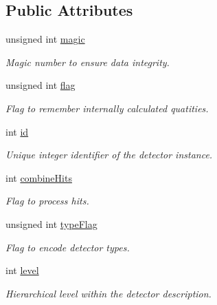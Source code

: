 \subsection*{Public Attributes}
\begin{DoxyCompactItemize}
\item 
unsigned int \hyperlink{class_d_d4hep_1_1_geometry_1_1_det_element_object_a9a65b2f4323f3df2d7bdb7858b216fb6}{magic}
\begin{DoxyCompactList}\small\item\em Magic number to ensure data integrity. \item\end{DoxyCompactList}\item 
unsigned int \hyperlink{class_d_d4hep_1_1_geometry_1_1_det_element_object_abcab90748d7423310fbf73fcc54cef47}{flag}
\begin{DoxyCompactList}\small\item\em Flag to remember internally calculated quatities. \item\end{DoxyCompactList}\item 
int \hyperlink{class_d_d4hep_1_1_geometry_1_1_det_element_object_a32d2a3f77fa7afde62ad5d08aa14919f}{id}
\begin{DoxyCompactList}\small\item\em Unique integer identifier of the detector instance. \item\end{DoxyCompactList}\item 
int \hyperlink{class_d_d4hep_1_1_geometry_1_1_det_element_object_a36e650a06cc4b82337bc3354bd38402a}{combineHits}
\begin{DoxyCompactList}\small\item\em Flag to process hits. \item\end{DoxyCompactList}\item 
unsigned int \hyperlink{class_d_d4hep_1_1_geometry_1_1_det_element_object_a0038f8f124cb13a1cca03af95964dcf5}{typeFlag}
\begin{DoxyCompactList}\small\item\em Flag to encode detector types. \item\end{DoxyCompactList}\item 
int \hyperlink{class_d_d4hep_1_1_geometry_1_1_det_element_object_a734b4a41fa1d35d9a02b3b15d2739537}{level}
\begin{DoxyCompactList}\small\item\em Hierarchical level within the detector description. \item\end{DoxyCompactList}\item 

\end{DoxyCompactItemize}
